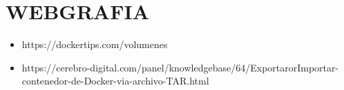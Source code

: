 \section{WEBGRAFIA} 

\begin{itemize}
\item https://dockertips.com/volumenes
\item https://cerebro-digital.com/panel/knowledgebase/64/ExportarorImportar-contenedor-de-Docker-via-archivo-TAR.html




\end{itemize}